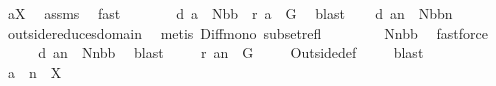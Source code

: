 \begin{isabellebody}
\ {\isachardoublequoteopen}a{\isasymin}{\isacharquery}X{}{\isachardoublequoteclose}\ \isamarkupfalse%
\ assms{\isacharparenleft}{}{\isacharparenright}\ \isamarkupfalse%
\ fast\ \isamarkupfalse%
\ \isamarkupfalse%
\ \isanewline
\ \ {}{\isacharcolon}\ {\isachardoublequoteopen}{\isacharquery}d\ a\ {\isasymsubseteq}\ N{\isacharminus}{\isacharbraceleft}{\isacharquery}bb{\isacharbraceright}\ {\isacharampersand}\ {\isasymUnion}{\isacharquery}r\ a\ {\isasymsubseteq}\ G{\isachardoublequoteclose}\ \isamarkupfalse%
\ blast\ \isamarkupfalse%
\ \isamarkupfalse%
\ {\isachardoublequoteopen}{\isacharquery}d\ {\isacharparenleft}a{\isacharminus}{\isacharminus}n{\isacharparenright}\ {\isasymsubseteq}\ N{\isacharminus}{\isacharbraceleft}{\isacharquery}bb{\isacharbraceright}{\isacharminus}{\isacharbraceleft}n{\isacharbraceright}{\isachardoublequoteclose}\ \isanewline
\ \ \isamarkupfalse%
\ outside{\isacharunderscore}reduces{\isacharunderscore}domain\ \isamarkupfalse%
\ {\isacharparenleft}metis\ Diff{\isacharunderscore}mono\ subset{\isacharunderscore}refl{\isacharparenright}\ \isamarkupfalse%
\ \isamarkupfalse%
\ \isanewline
\ \ {\isachardoublequoteopen}{\isachardot}{\isachardot}{\isachardot}\ {\isacharequal}\ N{\isacharminus}{\isacharbraceleft}n{\isacharbraceright}{\isacharminus}{\isacharbraceleft}{\isacharquery}bb{\isacharbraceright}{\isachardoublequoteclose}\ \isamarkupfalse%
\ fastforce\ \isamarkupfalse%
\ \isamarkupfalse%
\ \isanewline
\ \ {\isachardoublequoteopen}{\isacharquery}d\ {\isacharparenleft}a{\isacharminus}{\isacharminus}n{\isacharparenright}\ {\isasymsubseteq}\ N{\isacharminus}{\isacharbraceleft}n{\isacharbraceright}{\isacharminus}{\isacharbraceleft}{\isacharquery}bb{\isacharbraceright}{\isachardoublequoteclose}\ \isamarkupfalse%
\ blast\ \isamarkupfalse%
\ \isamarkupfalse%
\ {\isachardoublequoteopen}{\isasymUnion}\ {\isacharquery}r\ {\isacharparenleft}a{\isacharminus}{\isacharminus}n{\isacharparenright}\ {\isasymsubseteq}\ G{\isachardoublequoteclose}\ \isanewline
\ \ \isamarkupfalse%
\ Outside{\isacharunderscore}def\ \isamarkupfalse%
\ {}\ \isamarkupfalse%
\ blast\ \isamarkupfalse%
\ \isamarkupfalse%
\ {\isachardoublequoteopen}a\ {\isacharminus}{\isacharminus}\ n\ {\isasymin}\ {\isacharquery}X{}{\isachardoublequoteclose}\ \isamarkupfalse%

\end{isabellebody}
